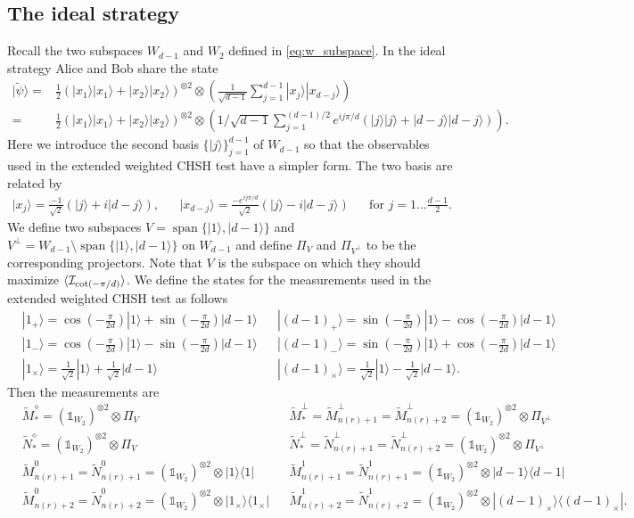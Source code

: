 \documentclass[11pt,letterpaper]{article}
\newcommand{\ket}[1]{|#1\rangle}
\newcommand{\ketbra}[2]{|#1\rangle\langle#2|}
\newcommand{\x}{\otimes}
\DeclarePairedDelimiter{\ip}{\langle}{\rangle}
\DeclareMathOperator{\spn}{span}
\newcommand{\1}{\mathbb{1}}
\newcommand{\tM}{\tilde{M}}
\newcommand{\tN}{\tilde{N}}
\newcommand{\tpsi}{\tilde{\psi}}
\newcommand{\nr}{n(r)}
\newcommand{\I}{\mathcal{I}}
\theoremstyle{definition}
\begin{document}
\subsection{The ideal strategy}
Recall the two subspaces $W_{d-1}$ and $W_2$ defined in \cref{eq:w_subspace}. 
In the ideal strategy Alice and Bob share the state 
\begin{align*}
\ket{\tpsi} = &\frac{1}{2} (\ket{x_1}\ket{x_1} + \ket{x_2}\ket{x_2})^{\x 2} \x \left(\frac{1}{\sqrt{d-1}} \sum_{j=1}^{d-1} \ket{x_j}\ket{x_{d-j}}\right)\\
=&\frac{1}{2} (\ket{x_1}\ket{x_1} + \ket{x_2}\ket{x_2})^{\x 2} \x \left(1/\sqrt{d-1} \sum_{j=1}^{(d-1)/2} e^{ij\pi/d}(\ket{j}\ket{j} + \ket{d-j}\ket{d-j})\right).
\end{align*}
Here we introduce the second basis $\{ \ket{j} \}_{j=1}^{d-1}$ of $W_{d-1}$ so that
the observables used in the extended weighted CHSH test have a simpler form.
The two basis are related by
\begin{align*}
	\ket{x_j} = \frac{-1}{\sqrt{2}}(\ket{j} + i\ket{d-j}), &&
	\ket{x_{d-j}} = \frac{-e^{ij\pi/d}}{\sqrt{2}}(\ket{j} - i\ket{d-j}) && \text{for } j = 1 \dots \frac{d-1}{2}.
\end{align*}
We define two subspaces $V = \spn\{\ket{1}, \ket{d-1}\}$ and $V^\perp = W_{d-1} \setminus\spn\{\ket{1}, \ket{d-1}\}$ on
$W_{d-1}$ and
define $\Pi_V$ and $\Pi_{V^\perp}$ to be the corresponding projectors. Note that $V$ is the subspace on which they should maximize $\ip{\I_{\cot(-\pi/d)}}$.
We define the states for the measurements used in the extended weighted CHSH test as follows
\begin{align*}
	&\ket{1_+} = \cos(-\frac{\pi}{2d})\ket{1} + \sin(-\frac{\pi}{2d})\ket{d-1}
	&&\ket{(d-1)_+} = \sin(-\frac{\pi}{2d})\ket{1} - \cos(-\frac{\pi}{2d})\ket{d-1}\\
	&\ket{1_-} = \cos(-\frac{\pi}{2d})\ket{1} - \sin(-\frac{\pi}{2d})\ket{d-1}
	&&\ket{(d-1)_-} = \sin(-\frac{\pi}{2d})\ket{1} + \cos(-\frac{\pi}{2d})\ket{d-1}\\
	&\ket{1_{\times}} = \frac{1}{\sqrt{2}}\ket{1} + \frac{1}{\sqrt{2}}\ket{d-1}
	&&\ket{(d-1)_{\times}} = \frac{1}{\sqrt{2}}\ket{1} - \frac{1}{\sqrt{2}}\ket{d-1}.
\end{align*}
Then the measurements are
\begin{align*}
	&\tM_\ast^\diamond =(\1_{W_2})^{\x 2} \x \Pi_V && \tM_\ast^\perp = \tM_{\nr+1}^\perp = \tM_{\nr+2}^\perp = (\1_{W_2})^{\x 2} \x \Pi_{V^\perp}\\
	&\tN_\ast^\diamond = (\1_{W_2})^{\x 2} \x \Pi_V && \tN_\ast^\perp = \tN_{\nr+1}^\perp = \tN_{\nr+2}^\perp = (\1_{W_2})^{\x 2} \x \Pi_{V^\perp}\\
	&\tM_{\nr+1}^0 =\tN_{\nr+1}^0=(\1_{W_2})^{\x 2} \x  \ketbra{1}{1} && \tM_{\nr+1}^1=\tN_{\nr+1}^1 = (\1_{W_2})^{\x 2} \x \ketbra{d-1}{d-1}\\
	&\tM_{\nr+2}^0 =\tN_{\nr+2}^0=(\1_{W_2})^{\x 2} \x  \ketbra{1_{\times}}{1_{\times}} && \tM_{\nr+2}^1= \tN_{\nr+2}^1 = (\1_{W_2})^{\x 2} \x \ketbra{(d-1)_{\times}}{(d-1)_{\times}}.
\end{align*}
\end{document}
